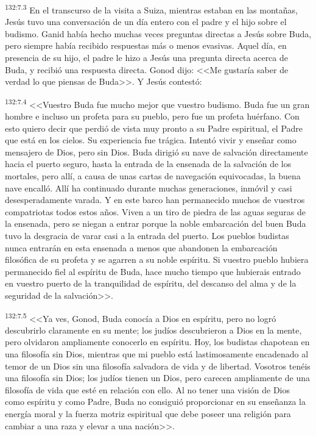 \par 
\textsuperscript{132:7.3} En el transcurso de la visita a Suiza, mientras estaban en las montañas, Jesús tuvo una conversación de un día entero con el padre y el hijo sobre el budismo. Ganid había hecho muchas veces preguntas directas a Jesús sobre Buda, pero siempre había recibido respuestas más o menos evasivas. Aquel día, en presencia de su hijo, el padre le hizo a Jesús una pregunta directa acerca de Buda, y recibió una respuesta directa. Gonod dijo: <<Me gustaría saber de verdad lo que piensas de Buda>>. Y Jesús contestó:

\par 
\textsuperscript{132:7.4} <<Vuestro Buda fue mucho mejor que vuestro budismo. Buda fue un gran hombre e incluso un profeta para su pueblo, pero fue un profeta huérfano. Con esto quiero decir que perdió de vista muy pronto a su Padre espiritual, el Padre que está en los cielos. Su experiencia fue trágica. Intentó vivir y enseñar como mensajero de Dios, pero sin Dios. Buda dirigió su nave de salvación directamente hacia el puerto seguro, hasta la entrada de la ensenada de la salvación de los mortales, pero allí, a causa de unas cartas de navegación equivocadas, la buena nave encalló. Allí ha continuado durante muchas generaciones, inmóvil y casi desesperadamente varada. Y en este barco han permanecido muchos de vuestros compatriotas todos estos años. Viven a un tiro de piedra de las aguas seguras de la ensenada, pero se niegan a entrar porque la noble embarcación del buen Buda tuvo la desgracia de varar casi a la entrada del puerto. Los pueblos budistas nunca entrarán en esta ensenada a menos que abandonen la embarcación filosófica de su profeta y se agarren a su noble espíritu. Si vuestro pueblo hubiera permanecido fiel al espíritu de Buda, hace mucho tiempo que hubierais entrado en vuestro puerto de la tranquilidad de espíritu, del descanso del alma y de la seguridad de la salvación>>.

\par 
\textsuperscript{132:7.5} <<Ya ves, Gonod, Buda conocía a Dios en espíritu, pero no logró descubrirlo claramente en su mente; los judíos descubrieron a Dios en la mente, pero olvidaron ampliamente conocerlo en espíritu. Hoy, los budistas chapotean en una filosofía sin Dios, mientras que mi pueblo está lastimosamente encadenado al temor de un Dios sin una filosofía salvadora de vida y de libertad. Vosotros tenéis una filosofía sin Dios; los judíos tienen un Dios, pero carecen ampliamente de una filosofía de vida que esté en relación con ello. Al no tener una visión de Dios como espíritu y como Padre, Buda no consiguió proporcionar en su enseñanza la energía moral y la fuerza motriz espiritual que debe poseer una religión para cambiar a una raza y elevar a una nación>>.

